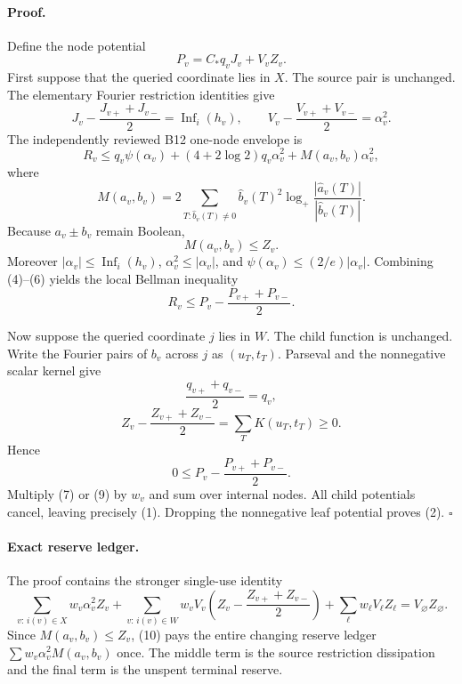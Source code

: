 \paragraph{Proof.}
Define the node potential
\[
 P_v=C_*q_vJ_v+V_vZ_v.                                           \tag{3}
\]
First suppose that the queried coordinate lies in \(X\).  The source pair is
unchanged.  The elementary Fourier restriction identities give
\[
 J_v-\frac{J_{v+}+J_{v-}}2=\operatorname{Inf}_i(h_v),\qquad
 V_v-\frac{V_{v+}+V_{v-}}2=\alpha_v^2.                            \tag{4}
\]
The independently reviewed B12 one-node envelope is
\[
 R_v\le q_v\psi(\alpha_v)+(4+2\log2)q_v\alpha_v^2
             +M(a_v,b_v)\alpha_v^2,                              \tag{5}
\]
where
\[
 M(a_v,b_v)=2\sum_{T:\widehat b_v(T)\ne0}
 \widehat b_v(T)^2\log_+\frac{|\widehat a_v(T)|}{|\widehat b_v(T)|}.
\]
Because \(a_v\pm b_v\) remain Boolean,
\[
 M(a_v,b_v)\le Z_v.                                               \tag{6}
\]
Moreover \(|\alpha_v|\le\operatorname{Inf}_i(h_v)\),
\(\alpha_v^2\le|\alpha_v|\), and
\(\psi(\alpha_v)\le(2/e)|\alpha_v|\).  Combining (4)--(6) yields the
local Bellman inequality
\[
 R_v\le P_v-\frac{P_{v+}+P_{v-}}2.                                \tag{7}
\]

Now suppose the queried coordinate \(j\) lies in \(W\).  The child function
is unchanged.  Write the Fourier pairs of \(b_v\) across \(j\) as
\((u_T,t_T)\).  Parseval and the nonnegative scalar kernel give
\[
 \frac{q_{v+}+q_{v-}}2=q_v,
\]
\[
 Z_v-\frac{Z_{v+}+Z_{v-}}2
 =\sum_TK(u_T,t_T)\ge0.                                          \tag{8}
\]
Hence
\[
 0\le P_v-\frac{P_{v+}+P_{v-}}2.                                 \tag{9}
\]
Multiply (7) or (9) by \(w_v\) and sum over internal nodes.  All child
potentials cancel, leaving precisely (1).  Dropping the nonnegative leaf
potential proves (2). \(\square\)

\paragraph{Exact reserve ledger.}
The proof contains the stronger single-use identity
\[
 \sum_{v:\,i(v)\in X}w_v\alpha_v^2Z_v
 +\sum_{v:\,i(v)\in W}w_vV_v
   \left(Z_v-\frac{Z_{v+}+Z_{v-}}2\right)
 +\sum_{\ell}w_\ell V_\ell Z_\ell
 =V_\varnothing Z_\varnothing.                                  \tag{10}
\]
Since \(M(a_v,b_v)\le Z_v\), (10) pays the entire changing reserve ledger
\(\sum w_v\alpha_v^2M(a_v,b_v)\) once.  The middle term is the source
restriction dissipation and the final term is the unspent terminal reserve.

